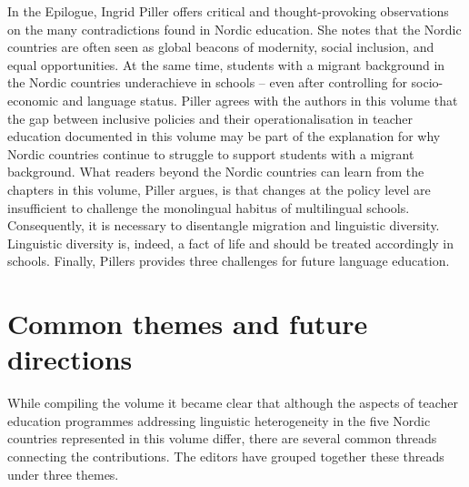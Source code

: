 \documentclass[output=paper]{langscibook}
\begin{document}
In the Epilogue, Ingrid Piller offers critical and thought-provoking observations on the many contradictions found in Nordic education. She notes that the Nordic countries are often seen as global beacons of modernity, social inclusion, and equal opportunities. At the same time, students with a migrant background in the Nordic countries underachieve in schools – even after controlling for socio-economic and language status. Piller agrees with the authors in this volume that the gap between inclusive policies and their operationalisation in teacher education documented in this volume may be part of the explanation for why Nordic countries continue to struggle to support students with a migrant background. What readers beyond the Nordic countries can learn from the chapters in this volume, Piller argues, is that changes at the policy level are insufficient to challenge the monolingual habitus of multilingual schools. Consequently, it is necessary to disentangle migration and linguistic diversity. Linguistic diversity is, indeed, a fact of life and should be treated accordingly in schools. Finally, Pillers provides three challenges for future language education. 

\section{Common themes and future directions}\label{sec:reath:7}

While compiling the volume it became clear that although the aspects of teacher education programmes addressing linguistic heterogeneity in the five Nordic countries represented in this volume differ, there are several common threads connecting the contributions. The editors have grouped together these threads under three themes. 
\end{document}
